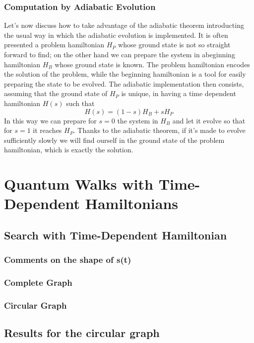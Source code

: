 \documentclass[11pt, twoside]{report}
\begin{document}
\subsection{Computation by Adiabatic Evolution}
Let's now discuss how to take advantage of the adiabatic theorem introducting the usual way in which the adiabatic evolution is implemented. It is often presented a problem hamiltonian $H_P$ whose ground state is not so straight forward to find; on the other hand we can prepare the system in abeginning hamiltonian $H_B$ whose ground state is known. The problem hamiltonian encodes the solution of the problem, while the beginning hamiltonian is a tool for easily preparing the state to be evolved. The adiabatic implementation then consists, assuming that the ground state of $H_P$ is unique, in having a time dependent hamiltonian $H(s)$ such that
\begin{equation}
    H(s) = (1-s)H_B + s H_P
\end{equation}
In this way we can prepare for $s=0$ the system in $H_B$ and let it evolve so that for $s=1$ it reaches $H_P$. Thanks to the adiabatic theorem, if it's made to evolve sufficiently slowly we will find ourself in the ground state of the problem hamiltonian, which is exactly the solution.



\newpage
\thispagestyle{empty}
\chapter{Quantum Walks with Time-Dependent Hamiltonians}


\section{Search with Time-Dependent Hamiltonian}
\subsection{Comments on the shape of s(t)}
\subsection{Complete Graph}
\subsection{Circular Graph}

\section{Results for the circular graph}
\end{document}
